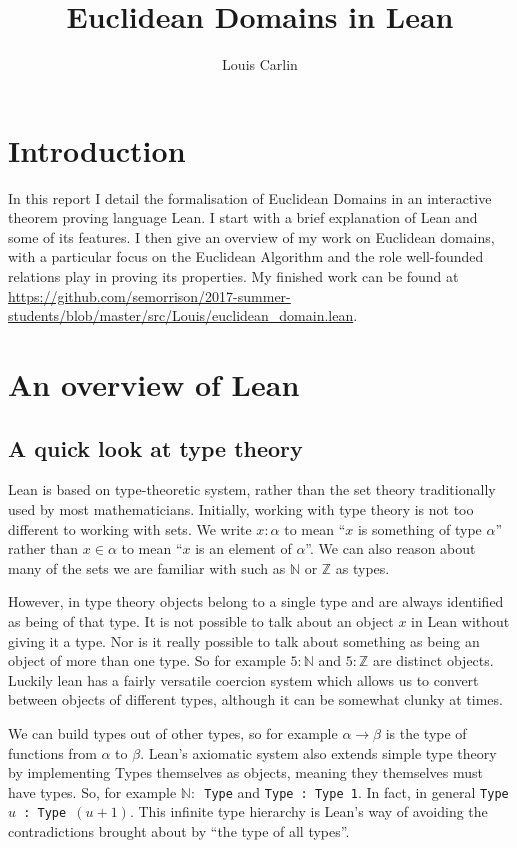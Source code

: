 \documentclass{article}
\author{Louis Carlin}
\title{Euclidean Domains in Lean}
\newcommand{\Z}{\ensuremath{\mathbb{Z}}}
\newcommand{\N}{\ensuremath{\mathbb{N}}}
\renewcommand{\a}{\alpha}
\newcommand{\ct}{\texttt}
\begin{document}
\maketitle
\newpage 

\section*{Introduction}
In this report I detail the formalisation of Euclidean Domains in an interactive theorem proving language Lean. I start with a brief explanation of Lean and some of its features. I then give an overview of my work on Euclidean domains, with a particular focus on the Euclidean Algorithm and the role well-founded relations play in proving its properties. My finished work can be found at \url{https://github.com/semorrison/2017-summer-students/blob/master/src/Louis/euclidean\_domain.lean}.

\section{An overview of Lean}

\subsection{A quick look at type theory}
Lean is based on type-theoretic system, rather than the set theory traditionally used by most mathematicians. 
Initially, working with type theory is not too different to working with sets. 
We write $x:\a$ to mean ``$x$ is something of type $\a$'' rather than $x \in \a$ to mean ``$x$ is an element of $\a$''. 
We can also reason about many of the sets we are familiar with such as $\N$ or $\Z$ as types.

However, in type theory objects belong to a single type and are always identified as being of that type.
It is not possible to talk about an object $x$ in Lean without giving it a type.
Nor is it really possible to talk about something as being an object of more than one type.
So for example $5:\N$ and $5:\Z$ are distinct objects.
Luckily lean has a fairly versatile coercion system which allows us to convert between objects of different types, although it can be somewhat clunky at times.

We can build types out of other types, so for example $\a \to \beta$ is the type of functions from $\a$ to $\beta$. 
Lean's axiomatic system also extends simple type theory by implementing Types themselves as objects, meaning they themselves must have types.
So, for example \ct{$\N:$ Type} and \ct{Type : Type 1}.
In fact, in general \ct{Type $u$ : Type $(u+1)$}. 
This infinite type hierarchy is Lean's way of avoiding the contradictions brought about by ``the type of all types''.
\end{document}
